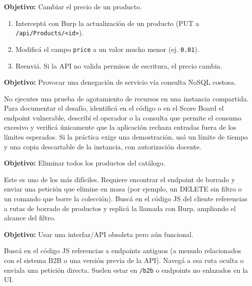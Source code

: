 \documentclass[11pt,a4paper]{article}
\begin{document}
\begin{desafio}
\textbf{Objetivo:} Cambiar el precio de un producto.
\begin{solucion}
\begin{enumerate}[leftmargin=*]
  \item Interceptá con Burp la actualización de un producto (PUT a \texttt{/api/Products/<id>}).
  \item Modificá el campo \texttt{price} a un valor mucho menor (ej. \texttt{0.01}).
  \item Reenviá. Si la API no valida permisos de escritura, el precio cambia.
\end{enumerate}
\end{solucion}
\end{desafio}

\begin{desafio}
\textbf{Objetivo:} Provocar una denegación de servicio vía consulta NoSQL costosa.
\begin{solucion}
No ejecutes una prueba de agotamiento de recursos en una instancia compartida. Para documentar el desafío, identificá en el código o en el Score Board el endpoint vulnerable, describí el operador o la consulta que permite el consumo excesivo y verificá únicamente que la aplicación rechaza entradas fuera de los límites esperados. Si la práctica exige una demostración, usá un límite de tiempo y una copia descartable de la instancia, con autorización docente.
\end{solucion}
\end{desafio}

\begin{desafio}
\textbf{Objetivo:} Eliminar todos los productos del catálogo.
\begin{solucion}
Este es uno de los más difíciles. Requiere encontrar el endpoint de borrado y enviar una petición que elimine en masa (por ejemplo, un DELETE sin filtro o un comando que borre la colección). Buscá en el código JS del cliente referencias a rutas de borrado de productos y replicá la llamada con Burp, ampliando el alcance del filtro.
\end{solucion}
\end{desafio}

\begin{desafio}
\textbf{Objetivo:} Usar una interfaz/API obsoleta pero aún funcional.
\begin{solucion}
Buscá en el código JS referencias a endpoints antiguos (a menudo relacionados con el sistema B2B o una versión previa de la API). Navegá a esa ruta oculta o enviala una petición directa. Suelen estar en \texttt{/b2b} o endpoints no enlazados en la UI.
\end{solucion}
\end{desafio}
\end{document}
